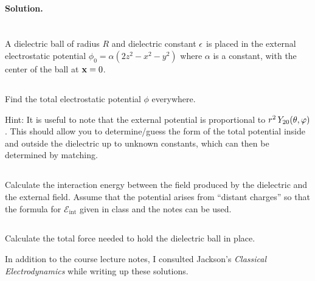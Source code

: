\documentclass[11pt]{article}
\newenvironment{statement}[1]
{
	\section{#1}
	\color{darkgray}
	\ignorespaces
}
{
}
\newenvironment{problem}
{
	\subsection{}
	\color{darkgray}
    \ignorespaces
}
{

}
\newenvironment{solution}
{
    \paragraph{Solution.}
    \ignorespaces
}
{
    \bigskip
}
\begin{document}
\begin{solution}
\end{solution}



\newcommand{\phio}{\phi_0}
\newcommand{\alp}{\alpha}
\newcommand{\cE}{\mathcal{E}}
\newcommand{\cEint}{\cE_\text{int}}

\begin{statement}{}
	A dielectric ball of radius $R$ and dielectric constant $\epsilon$ is placed in the external electrostatic potential $\phio = \alp (2z^2 - x^2 - y^2)$ where $\alp$ is a constant, with the center of the ball at $\mathbf{x} = 0$.
\end{statement}

\begin{problem}
	Find the total electrostatic potential $\phi$ everywhere.
	
	Hint: It is useful to note that the external potential is proportional to $r^2 \, Y_{2 0}(\theta, \varphi)$.  This should allow you to determine/guess the form of the total potential inside and outside the dielectric up to unknown constants, which can then be determined by matching.
\end{problem}

\begin{problem}
	Calculate the interaction energy between the field produced by the dielectric and the external field.  Assume that the potential arises from ``distant charges'' so that the formula for $\cEint$ given in class and the notes can be used.
\end{problem}

\begin{problem}
	Calculate the total force needed to hold the dielectric ball in place.
\end{problem}



\vfill
In addition to the course lecture notes, I consulted Jackson's \emph{Classical Electrodynamics} while writing up these solutions.
\end{document}
